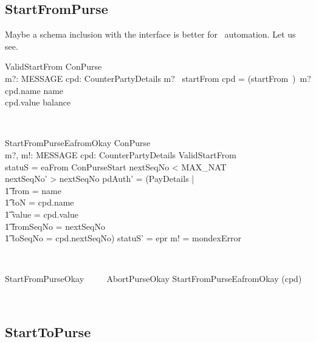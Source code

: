 \subsection{StartFromPurse}\label{ch4.valTransferOp.StartFromPurse}

Maybe a schema inclusion with the interface is better for \zeves\ automation.
Let us see.
\begin{LSDef}
\begin{schema}{ValidStartFrom}
   ConPurse \\
   m?: MESSAGE
   \also
   cpd: CounterPartyDetails
\where
   m? \in \ran~startFrom
   \also
   cpd = (startFrom~\inv)~m?
   \also
   cpd.name \neq name \\
   cpd.value \leq balance
\end{schema}~\end{LSDef}

\begin{LSDef}
\begin{schema}{StartFromPurseEafromOkay}
   \Delta ConPurse \\
   m?, m!: MESSAGE
   \also
   cpd: CounterPartyDetails
\where
   ValidStartFrom \\
   statuS = eaFrom
   \also
   \Xi ConPurseStart
   \also
   nextSeqNo < MAX\_NAT \\
   nextSeqNo' > nextSeqNo
   \also
   pdAuth' = (\mu PayDetails | \\
      \t1 from = name \\
      \t1 \land toN = cpd.name \\
      \t1 \land value = cpd.value \\
      \t1 \land fromSeqNo = nextSeqNo \\
      \t1 \land toSeqNo = cpd.nextSeqNo)
   \also
   statuS' = epr
   \also
   m! = mondexError
\end{schema}~\end{LSDef}

\begin{LSDef}
\begin{zed}
   StartFromPurseOkay ~~~~ AbortPurseOkay \semi StartFromPurseEafromOkay \hide (cpd)
\end{zed}~\end{LSDef}

\subsection{StartToPurse}

